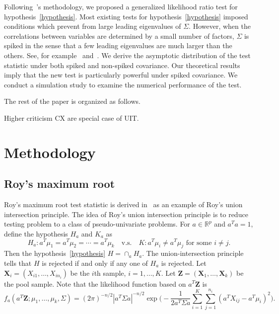 \documentclass[review]{elsarticle}
\newcommand{\bZ}{\mathbf{Z}}
\newcommand{\bX}{\mathbf{X}}
\theoremstyle{plain}
\theoremstyle{definition}
\theoremstyle{remark}
\begin{document}
    Following~\cite{Zhao2016A}'s methodology, we proposed a generalized likelihood ratio test for hypothesis~\eqref{hypothesis}.
    Most existing tests for hypothesis~\eqref{hypothesis} imposed conditions which prevent from large leading eigenvalues of $\Sigma$.
    However, when the correlations between variables are determined by a small number of factors, $\Sigma$ is spiked in the sense that a few leading eigenvalues are much larger than the others. See, for example~\cite{Cai2012Sparse} and~\cite{Shen2013Consistency}.
    We derive the asymptotic distribution of the test statistic under both spiked and non-spiked covariance.
    Our theoretical results imply that the new test is particularly powerful under spiked covariance.
    We conduct a simulation study to examine the numerical performance of the test.

    The rest of the paper is organized  as follows.

    Higher criticism CX are special case of UIT.
    
\section{Methodology}
\subsection{Roy's maximum root}
Roy's maximum root test statistic is derived in~\cite{Roy1953} as an example of Roy's union intersection principle.
The idea of Roy's union intersection principle is to reduce testing problem to a class of pseudo-univariate problems.
For $a\in \mathbb{R}^p$ and $a^T a=1$, define the hypothesis $H_a$ and $K_a$ as
$$
H_a: a^T\mu_1=a^T\mu_2=\cdots=a^T\mu_k\quad \text{v.s.}\quad K: \text{$a^T\mu_i\neq a^T\mu_j$ for some $i\neq j$}.
$$
Then the hypothesis~\eqref{hypothesis} $H=\cap_{a}H_a$.
The union-intersection principle tells that $H$ is rejected if and only if any one of $H_a$ is rejected.
Let $\bX_i=(X_{i1},\ldots,X_{in_i})$ be the $i$th sample, $i=1,\ldots,K$. Let $\bZ=(\bX_1,\ldots,\bX_k)$ be the pool sample.
Note that the likelihood function based on $a^T \bZ$ is 
$$
f_a(a^T \bZ;\mu_1,\ldots,\mu_k,\Sigma)=
    (2\pi)^{-n/2}|a^T \Sigma a|^{-n/2}\exp\Big(-\frac{1}{2 a^T \Sigma a}\sum_{i=1}^K\sum_{j=1}^{n_i}(a^T X_{ij}-a^T\mu_i)^2\Big).
$$
\end{document}
